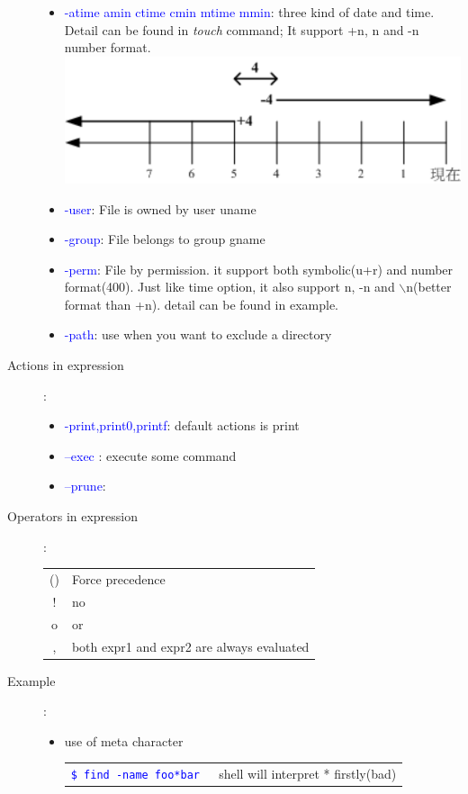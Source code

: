 \documentclass[a4paper,12pt,twoside]{book}
\newcommand{\linuxcommand}[1]{\texttt{\textcolor{blue}{\$ #1 \Pisymbol{psy}{191}}}}
\newcommand{\op}[1]{\textcolor{blue}{-#1}}
\begin{document}
\begin{CJK*}{UTF8}{song}
\begin{description}
\begin{itemize}
		\item \op{atime amin ctime cmin mtime mmin}: three kind of date and time. Detail can be found in \emph{touch} command;
		It support +n, n and -n number format.  \\
		\includegraphics[scale=0.5]{pics/find_time}
		\item \op{user}: File is owned by user uname
		\item \op{group}: File belongs to group gname
		\item \op{perm}: File by permission. it support both symbolic(u+r) and number format(400). Just like time option, it also support n, -n and $\backslash$n(better format than +n). detail can be found in example.
		\item \op{path}: use when you want to exclude a directory	
		\end{itemize}
	\item[Actions in expression]:
		\begin{itemize}
		\item \op{print,print0,printf}: default actions is print
		\item \op{-exec }: execute some command
		\item \op{-prune}:
		\end{itemize}
	\item[Operators in expression]: \\
		\begin{tabular}{c|p{}}
		\hline
		() & Force  precedence \\
		! & no \\
		o & or \\
		, & both expr1 and expr2 are always evaluated \\
		\hline
		\end{tabular}
	\item[Example]:
		\begin{itemize}
		\item use of meta character \\
		\begin{tabular}{c|l}
		\hline \linuxcommand{find -name foo*bar} & shell will interpret * firstly(bad)\\

\end{tabular}
\end{itemize}
\end{description}
\end{CJK*}
\end{document}
